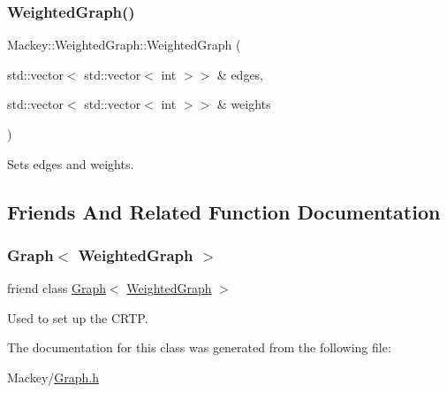 \subsubsection{\texorpdfstring{Weighted\+Graph()}{WeightedGraph()}\hspace{0.1cm}{\footnotesize\ttfamily [3/3]}}
{\footnotesize\ttfamily Mackey\+::\+Weighted\+Graph\+::\+Weighted\+Graph (\begin{DoxyParamCaption}\item[{std\+::vector$<$ std\+::vector$<$ int $>$$>$ \&}]{edges,  }\item[{std\+::vector$<$ std\+::vector$<$ int $>$$>$ \&}]{weights }\end{DoxyParamCaption})\hspace{0.3cm}{\ttfamily [inline]}}



Sets edges and weights. 



\subsection{Friends And Related Function Documentation}
\mbox{\label{classMackey_1_1WeightedGraph_aa4863e14b8d7dcd76942894cae55e453}} 
\subsubsection{\texorpdfstring{Graph$<$ Weighted\+Graph $>$}{Graph< WeightedGraph >}}
{\footnotesize\ttfamily friend class \hyperlink{classMackey_1_1Graph}{Graph}$<$ \hyperlink{classMackey_1_1WeightedGraph}{Weighted\+Graph} $>$\hspace{0.3cm}{\ttfamily [friend]}}



Used to set up the C\+R\+TP. 



The documentation for this class was generated from the following file\+:\begin{DoxyCompactItemize}
\item 
Mackey/\hyperlink{Graph_8h}{Graph.\+h}\end{DoxyCompactItemize}
